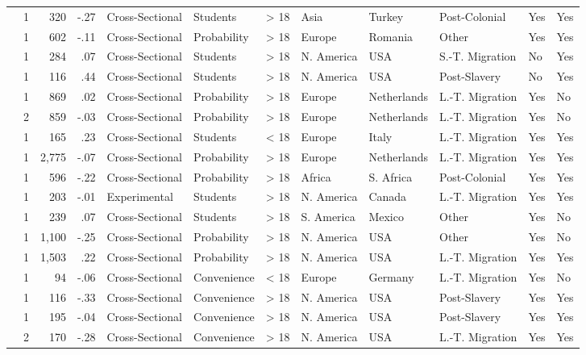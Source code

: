 \documentclass[10pt, letterpaper]{article}
\begin{document}
\begin{landscape}
\begin{xltabular}{650pt}{Xrrrllrlllll}
\cite{1614} & 1 & 320 & -.27 & Cross-Sectional & Students & > 18 & Asia & Turkey & Post-Colonial & Yes & Yes\\
\cite{3205} & 1 & 602 & -.11 & Cross-Sectional & Probability & > 18 & Europe & Romania & Other & Yes & Yes\\
\cite{91} & 1 & 284 & .07 & Cross-Sectional & Students & > 18 & N. America & USA & S.-T. Migration & No & Yes\\
\cite{1163} & 1 & 116 & .44 & Cross-Sectional & Students & > 18 & N. America & USA & Post-Slavery & No & Yes\\
\cite{783} & 1 & 869 & .02 & Cross-Sectional & Probability & > 18 & Europe & Netherlands & L.-T. Migration & Yes & No\\
 & 2 & 859 & -.03 & Cross-Sectional & Probability & > 18 & Europe & Netherlands & L.-T. Migration & Yes & No\\
\cite{3196} & 1 & 165 & .23 & Cross-Sectional & Students & < 18 & Europe & Italy & L.-T. Migration & Yes & Yes\\
\cite{1807} & 1 & 2,775 & -.07 & Cross-Sectional & Probability & > 18 & Europe & Netherlands & L.-T. Migration & Yes & Yes\\
\cite{336} & 1 & 596 & -.22 & Cross-Sectional & Probability & > 18 & Africa & S. Africa & Post-Colonial & Yes & Yes\\
\cite{2033} & 1 & 203 & -.01 & Experimental & Students & > 18 & N. America & Canada & L.-T. Migration & Yes & Yes\\
\cite{4001} & 1 & 239 & .07 & Cross-Sectional & Students & > 18 & S. America & Mexico & Other & Yes & No\\
\cite{325} & 1 & 1,100 & -.25 & Cross-Sectional & Probability & > 18 & N. America & USA & Other & Yes & No\\
\cite{1576} & 1 & 1,503 & .22 & Cross-Sectional & Probability & > 18 & N. America & USA & L.-T. Migration & Yes & Yes\\
\cite{1949} & 1 & 94 & -.06 & Cross-Sectional & Convenience & < 18 & Europe & Germany & L.-T. Migration & Yes & No\\
\cite{4003} & 1 & 116 & -.33 & Cross-Sectional & Convenience & > 18 & N. America & USA & Post-Slavery & Yes & Yes\\
\cite{2309} & 1 & 195 & -.04 & Cross-Sectional & Convenience & > 18 & N. America & USA & Post-Slavery & Yes & Yes\\
 & 2 & 170 & -.28 & Cross-Sectional & Convenience & > 18 & N. America & USA & L.-T. Migration & Yes & Yes\\

\end{xltabular}
\end{landscape}
\end{document}
